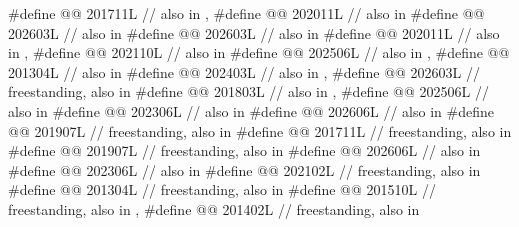 \begin{codeblock}
#define @@                  201711L // also in , 
#define @@                       202011L // also in 
#define @@                          202603L // also in 
#define @@                       202603L // also in 
#define @@                   202011L // also in , 
#define @@       202110L // also in 
#define @@                    202506L // also in , 
#define @@                       201304L // also in 
#define @@                       202403L // also in , 
#define @@                         202603L // freestanding, also in 
#define @@                           201803L // also in , 
#define @@                              202506L // also in 
#define @@                     202306L // also in 
#define @@                 202606L // also in 
#define @@              201907L // freestanding, also in 
#define @@                        201711L // freestanding, also in 
#define @@                          201907L // freestanding, also in 
#define @@                          202606L // also in 
#define @@                         202306L // also in 
#define @@                     202102L // freestanding, also in 
#define @@      201304L // freestanding, also in 
#define @@             201510L
  // freestanding, also in , 
#define @@                   201402L // freestanding, also in 

\end{codeblock}
